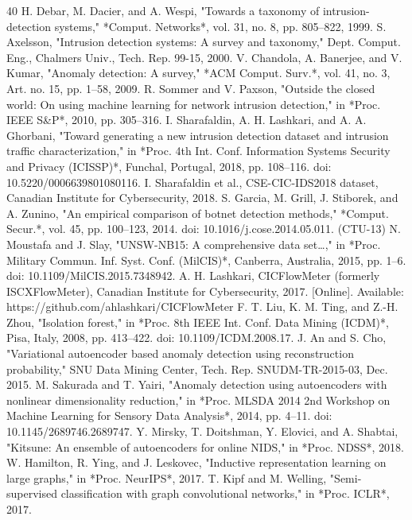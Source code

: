 \begin{thebibliography}{40}
 H. Debar, M. Dacier, and A. Wespi, "Towards a taxonomy of intrusion-detection systems," *Comput. Networks*, vol. 31, no. 8, pp. 805–822, 1999.
 S. Axelsson, "Intrusion detection systems: A survey and taxonomy," Dept. Comput. Eng., Chalmers Univ., Tech. Rep. 99-15, 2000.
 V. Chandola, A. Banerjee, and V. Kumar, "Anomaly detection: A survey," *ACM Comput. Surv.*, vol. 41, no. 3, Art. no. 15, pp. 1–58, 2009.
 R. Sommer and V. Paxson, "Outside the closed world: On using machine learning for network intrusion detection," in *Proc. IEEE S\&P*, 2010, pp. 305–316.
 I. Sharafaldin, A. H. Lashkari, and A. A. Ghorbani, "Toward generating a new intrusion detection dataset and intrusion traffic characterization," in *Proc. 4th Int. Conf. Information Systems Security and Privacy (ICISSP)*, Funchal, Portugal, 2018, pp. 108–116. doi: 10.5220/0006639801080116.
 I. Sharafaldin et al., CSE-CIC-IDS2018 dataset, Canadian Institute for Cybersecurity, 2018.
 S. Garcia, M. Grill, J. Stiborek, and A. Zunino, "An empirical comparison of botnet detection methods," *Comput. Secur.*, vol. 45, pp. 100–123, 2014. doi: 10.1016/j.cose.2014.05.011. (CTU-13)
 N. Moustafa and J. Slay, "UNSW-NB15: A comprehensive data set…," in *Proc. Military Commun. Inf. Syst. Conf. (MilCIS)*, Canberra, Australia, 2015, pp. 1–6. doi: 10.1109/MilCIS.2015.7348942.
 A. H. Lashkari, CICFlowMeter (formerly ISCXFlowMeter), Canadian Institute for Cybersecurity, 2017. [Online]. Available: https://github.com/ahlashkari/CICFlowMeter
 F. T. Liu, K. M. Ting, and Z.-H. Zhou, "Isolation forest," in *Proc. 8th IEEE Int. Conf. Data Mining (ICDM)*, Pisa, Italy, 2008, pp. 413–422. doi: 10.1109/ICDM.2008.17.
 J. An and S. Cho, "Variational autoencoder based anomaly detection using reconstruction probability," SNU Data Mining Center, Tech. Rep. SNUDM-TR-2015-03, Dec. 2015.
 M. Sakurada and T. Yairi, "Anomaly detection using autoencoders with nonlinear dimensionality reduction," in *Proc. MLSDA 2014 2nd Workshop on Machine Learning for Sensory Data Analysis*, 2014, pp. 4–11. doi: 10.1145/2689746.2689747.
 Y. Mirsky, T. Doitshman, Y. Elovici, and A. Shabtai, "Kitsune: An ensemble of autoencoders for online NIDS," in *Proc. NDSS*, 2018.
 W. Hamilton, R. Ying, and J. Leskovec, "Inductive representation learning on large graphs," in *Proc. NeurIPS*, 2017.
 T. Kipf and M. Welling, "Semi-supervised classification with graph convolutional networks," in *Proc. ICLR*, 2017.

\end{thebibliography}
